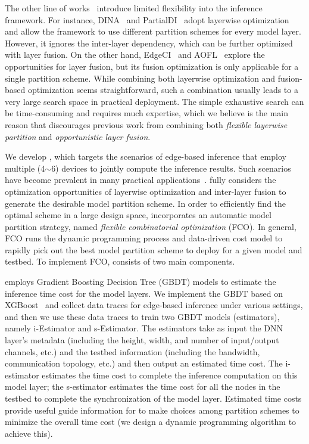 The other line of works~\cite{chen2024edgeci,dey2019embedded,mohammed2020distributed,zhou2019adaptive} introduce limited flexibility into the inference framework. For instance, DINA~\cite{mohammed2020distributed} and PartialDI~\cite{dey2019embedded} adopt layerwise optimization and allow the framework to use different partition schemes for every model layer. However, it ignores the inter-layer dependency, which can be further optimized with layer fusion. On the other hand, EdgeCI~\cite{chen2024edgeci} and AOFL~\cite{zhou2019adaptive} explore the opportunities for layer fusion, but its fusion optimization is only applicable for a single partition scheme. While combining both layerwise optimization and fusion-based optimization seems straightforward, such a combination usually leads to a very large search space in practical deployment. The simple exhaustive search can be time-consuming and requires much expertise, which we believe is the main reason that discourages previous work from combining both \emph{flexible layerwise partition} and \emph{opportunistic layer fusion}. 


 We develop \sysname, which targets the scenarios of edge-based inference that employ multiple (4$\sim$6) devices to jointly compute the inference results. Such scenarios have become prevalent in many practical applications~\cite{4orin,2orin}. \sysname fully considers the optimization opportunities of layerwise optimization and inter-layer fusion to generate the desirable model partition scheme. In order to efficiently find the optimal scheme in a large design space, \sysname incorporates an automatic model partition strategy, named \emph{flexible combinatorial optimization} (FCO). In general, FCO runs the dynamic programming process and data-driven cost model to rapidly pick out the best model partition scheme to deploy for a given model and testbed. To implement FCO, \sysname consists of two main components. 

 \sysname employs Gradient Boosting Decision Tree (GBDT) models to estimate the inference time cost for the model layers. We implement the GBDT based on XGBoost~\cite{chen2016xgboost} and collect data traces for edge-based inference under various settings, and then we use these data traces to train two GBDT models (estimators), namely i-Estimator and s-Estimator. The estimators take as input the DNN layer's metadata (including the height, width, and number of input/output channels, etc.) and the testbed information (including the bandwidth, communication topology, etc.) and then output an estimated time cost. The i-estimator estimates the time cost to complete the inference computation on this model layer; the s-estimator estimates the time cost for all the nodes in the testbed to complete the synchronization of the model layer. Estimated time costs provide useful guide information for \sysname to make choices among partition schemes to minimize the overall time cost (we design a dynamic programming algorithm to achieve this). 


